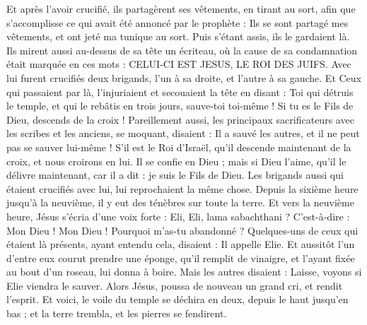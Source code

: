\begin{multicols}{2}
Et après l'avoir crucifié, ils partagèrent ses vêtements, en tirant au sort, afin que s'accomplisse ce qui avait été annoncé par le prophète : Ils se sont partagé mes vêtements, et ont jeté ma tunique au sort.
Puis s'étant assis, ils le gardaient là.
Ils mirent aussi au-dessus de sa tête un écriteau, où la cause de sa condamnation était marquée en ces mots : CELUI-CI EST JESUS, LE ROI DES JUIFS.
Avec lui furent crucifiés deux brigands, l'un à sa droite, et l'autre à sa gauche.
Et Ceux qui passaient par là, l'injuriaient et secouaient la tête
en disant : Toi qui détruis le temple, et qui le rebâtis en trois jours, sauve-toi toi-même ! Si tu es le Fils de Dieu, descends de la croix !
Pareillement aussi, les principaux sacrificateurs avec les scribes et les anciens, se moquant, disaient :
Il a sauvé les autres, et il ne peut pas se sauver lui-même ! S'il est le Roi d'Israël, qu'il descende maintenant de la croix, et nous croirons en lui.
Il se confie en Dieu ; mais si Dieu l'aime, qu'il le délivre maintenant, car il a dit : je suis le Fils de Dieu.
Les brigands aussi qui étaient crucifiés avec lui, lui reprochaient la même chose.
Depuis la sixième heure jusqu'à la neuvième, il y eut des ténèbres sur toute la terre.
Et vers la neuvième heure, Jésus s'écria d'une voix forte : Eli, Eli, lama sabachthani ? C'est-à-dire : Mon Dieu ! Mon Dieu ! Pourquoi m'as-tu abandonné ?
Quelques-uns de ceux qui étaient là présents, ayant entendu cela, disaient : Il appelle Elie.
Et aussitôt l'un d'entre eux courut prendre une éponge, qu'il remplit de vinaigre, et l'ayant fixée au bout d'un roseau, lui donna à boire.
Mais les autres disaient : Laisse, voyons si Elie viendra le sauver.
Alors Jésus, poussa de nouveau un grand cri, et rendit l'esprit.
Et voici, le voile du temple se déchira en deux, depuis le haut jusqu'en bas ; et la terre trembla, et les pierres se fendirent.

\end{multicols}
